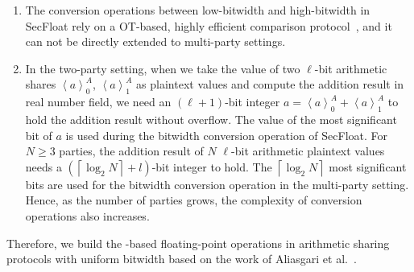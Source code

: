 \begin{enumerate}
    \item The conversion operations between low-bitwidth and high-bitwidth in SecFloat rely on a \twopc OT-based, highly efficient comparison protocol~\cite{rathee2020cryptflow2}, and it can not be directly extended to multi-party settings.
    \item In the two-party setting, when we take the value of two $\ell$-bit arithmetic shares $\left\langle a\right\rangle^A_0 $, $\left\langle a\right\rangle^A_1$ as plaintext values and compute the addition result in real number field, we need an $\left(\ell+1\right) $-bit integer $a =\left\langle a\right\rangle^A_0 +\left\langle a\right\rangle^A_1 $ to hold the addition result without overflow. The value of the most significant bit of $a$ is used during the bitwidth conversion operation of SecFloat. For $N\geq 3$ parties, the addition result of $N$ $\ell$-bit arithmetic plaintext values needs a $\left(\left\lceil \log_2{N}\right\rceil +l\right) $-bit integer to hold. The $\left\lceil \log_2{N}\right\rceil$ most significant bits are used for the bitwidth conversion operation in the multi-party setting. Hence, as the number of parties grows, the complexity of conversion operations also increases.
\end{enumerate}
Therefore, we build the \lsss-based floating-point operations in arithmetic sharing protocols with uniform bitwidth based on the work of Aliasgari et al.~\cite{aliasgari2012secure}.







